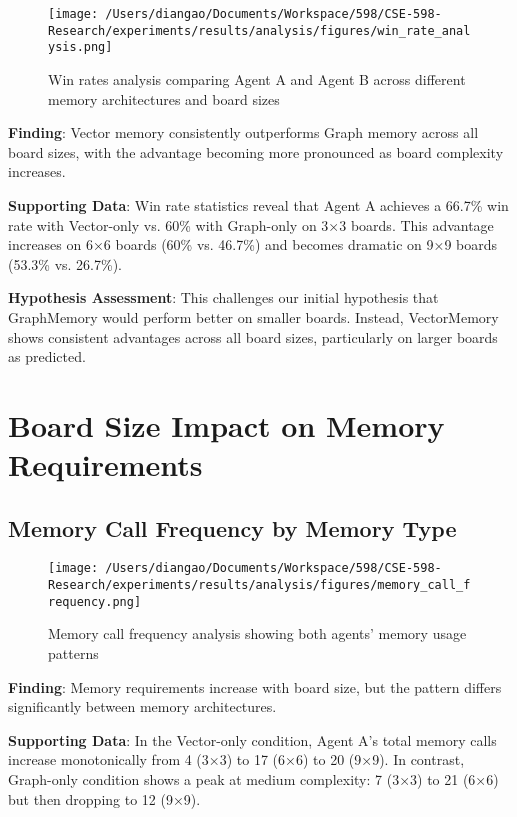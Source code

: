 \documentclass[10pt]{article}
\begin{document}
\begin{figure}[t]
    \centering
    \texttt{[image: /Users/diangao/Documents/Workspace/598/CSE-598-Research/experiments/results/analysis/figures/win\_rate\_analysis.png]}
    \caption{Win rates analysis comparing Agent A and Agent B across different memory architectures and board sizes}
    \label{fig:win_rates}
\end{figure}

\small
\textbf{Finding}: Vector memory consistently outperforms Graph memory across all board sizes, with the advantage becoming more pronounced as board complexity increases.

\textbf{Supporting Data}: Win rate statistics reveal that Agent A achieves a 66.7\% win rate with Vector-only vs. 60\% with Graph-only on 3×3 boards. This advantage increases on 6×6 boards (60\% vs. 46.7\%) and becomes dramatic on 9×9 boards (53.3\% vs. 26.7\%).

\textbf{Hypothesis Assessment}: This challenges our initial hypothesis that GraphMemory would perform better on smaller boards. Instead, VectorMemory shows consistent advantages across all board sizes, particularly on larger boards as predicted.

\section{Board Size Impact on Memory Requirements}

\subsection{Memory Call Frequency by Memory Type}

\begin{figure}[t]
    \centering
    \texttt{[image: /Users/diangao/Documents/Workspace/598/CSE-598-Research/experiments/results/analysis/figures/memory\_call\_frequency.png]}
    \caption{Memory call frequency analysis showing both agents' memory usage patterns}
    \label{fig:memory_frequency}
\end{figure}

\small
\textbf{Finding}: Memory requirements increase with board size, but the pattern differs significantly between memory architectures.

\textbf{Supporting Data}: In the Vector-only condition, Agent A's total memory calls increase monotonically from 4 (3×3) to 17 (6×6) to 20 (9×9). In contrast, Graph-only condition shows a peak at medium complexity: 7 (3×3) to 21 (6×6) but then dropping to 12 (9×9).
\end{document}

